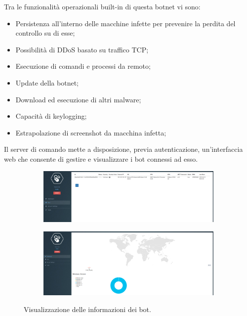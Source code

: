 Tra le funzionalità operazionali built-in  di questa botnet vi sono:
\begin{itemize}
    \item Persistenza all'interno delle macchine infette per prevenire la perdita del controllo su di esse;
    \item Possibilità di DDoS basato su traffico TCP;
    \item Esecuzione di comandi e  processi da remoto;
    \item Update della botnet;
    \item Download ed esecuzione di altri malware;
    \item Capacità di keylogging;
    \item Estrapolazione di screenshot da macchina infetta;
\end{itemize}

Il server di comando mette a disposizione, previa autenticazione, un'interfaccia web che consente di gestire e visualizzare i bot connessi ad esso.
\begin{figure}[hbtp]
    \centering
    \begin{subfigure}{0.45\textwidth}
        \centering
        \includegraphics[width=\textwidth,height=0.45\textwidth]{res/fig/uboat-home.png}
        \caption{}
        \label{fig:uboat-home-1}
    \end{subfigure}
    \begin{subfigure}{0.45\textwidth}
        \centering
        \includegraphics[width=\textwidth,height=0.45\textwidth]{res/fig/uboat-map.png}
        \caption{}
        \label{fig:uboat-home-2}
    \end{subfigure}
    \caption{Visualizzazione delle informazioni dei  bot.}
    \label{fig:uboat-home}
\end{figure}

